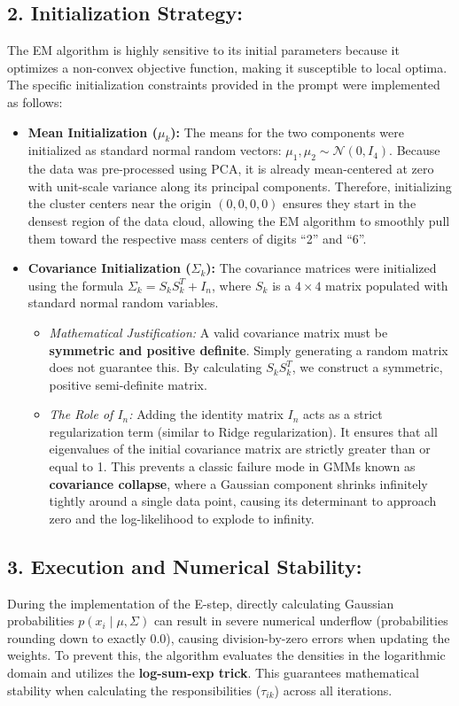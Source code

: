 \documentclass[twoside, 10pt]{article}
\begin{document}
\subsection*{2. Initialization Strategy:}
The EM algorithm is highly sensitive to its initial parameters because it optimizes a non-convex objective function, making it susceptible to local optima. The specific initialization constraints provided in the prompt were implemented as follows:
\begin{itemize}[topsep=0pt]
    \item \textbf{Mean Initialization ($\mu_k$):} The means for the two components were initialized as standard normal random vectors: $\mu_1, \mu_2 \sim \mathcal{N}(0, I_4)$. Because the data was pre-processed using PCA, it is already mean-centered at zero with unit-scale variance along its principal components. Therefore, initializing the cluster centers near the origin $(0,0,0,0)$ ensures they start in the densest region of the data cloud, allowing the EM algorithm to smoothly pull them toward the respective mass centers of digits ``2'' and ``6''.
    \item \textbf{Covariance Initialization ($\Sigma_k$):} The covariance matrices were initialized using the formula $\Sigma_k = S_k S_k^T + I_n$, where $S_k$ is a $4 \times 4$ matrix populated with standard normal random variables. 
    \begin{itemize}
        \item \textit{Mathematical Justification:} A valid covariance matrix must be \textbf{symmetric and positive definite}. Simply generating a random matrix does not guarantee this. By calculating $S_k S_k^T$, we construct a symmetric, positive semi-definite matrix. 
        \item \textit{The Role of $I_n$:} Adding the identity matrix $I_n$ acts as a strict regularization term (similar to Ridge regularization). It ensures that all eigenvalues of the initial covariance matrix are strictly greater than or equal to 1. This prevents a classic failure mode in GMMs known as \textbf{covariance collapse}, where a Gaussian component shrinks infinitely tightly around a single data point, causing its determinant to approach zero and the log-likelihood to explode to infinity.
    \end{itemize}
\end{itemize}

\subsection*{3. Execution and Numerical Stability:}
During the implementation of the E-step, directly calculating Gaussian probabilities $p(x_i \mid \mu, \Sigma)$ can result in severe numerical underflow (probabilities rounding down to exactly 0.0), causing division-by-zero errors when updating the weights. To prevent this, the algorithm evaluates the densities in the logarithmic domain and utilizes the \textbf{log-sum-exp trick}. This guarantees mathematical stability when calculating the responsibilities ($\tau_{ik}$) across all iterations.
\end{document}
